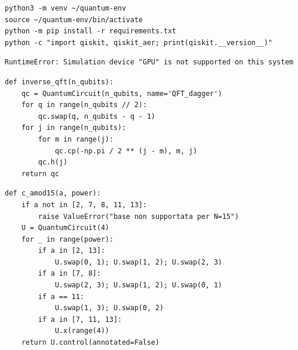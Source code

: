 \begin{lstlisting}[caption={Installazione dell'ambiente Python e delle librerie necessarie}, label={lst:installazione_dellambiente_python_e}]
python3 -m venv ~/quantum-env
source ~/quantum-env/bin/activate
python -m pip install -r requirements.txt
python -c "import qiskit, qiskit_aer; print(qiskit.__version__)"
\end{lstlisting}

\begin{lstlisting}[caption={Errore GPU osservato su WSL durante i test}, label={lst:errore_gpu_su_wsl}]
RuntimeError: Simulation device "GPU" is not supported on this system
\end{lstlisting}

\begin{lstlisting}[caption={Implementazione della Quantum Fourier Transform inversa}, label={lst:implementazione_della_quantum_fourier}]
def inverse_qft(n_qubits):
    qc = QuantumCircuit(n_qubits, name='QFT_dagger')
    for q in range(n_qubits // 2):
        qc.swap(q, n_qubits - q - 1)
    for j in range(n_qubits):
        for m in range(j):
            qc.cp(-np.pi / 2 ** (j - m), m, j)
        qc.h(j)
    return qc
\end{lstlisting}

\begin{lstlisting}[caption={Moltiplicazione modulare N15 corretta: l'operazione $\times a$ viene ripetuta \texttt{power} volte}, label={lst:modular_exponentiation_per_n15}]
def c_amod15(a, power):
    if a not in [2, 7, 8, 11, 13]:
        raise ValueError("base non supportata per N=15")
    U = QuantumCircuit(4)
    for _ in range(power):
        if a in [2, 13]:
            U.swap(0, 1); U.swap(1, 2); U.swap(2, 3)
        if a in [7, 8]:
            U.swap(2, 3); U.swap(1, 2); U.swap(0, 1)
        if a == 11:
            U.swap(1, 3); U.swap(0, 2)
        if a in [7, 11, 13]:
            U.x(range(4))
    return U.control(annotated=False)
\end{lstlisting}

